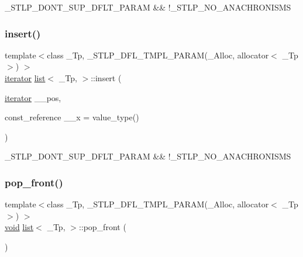 \+\_\+\+S\+T\+L\+P\+\_\+\+D\+O\+N\+T\+\_\+\+S\+U\+P\+\_\+\+D\+F\+L\+T\+\_\+\+P\+A\+R\+AM \&\& !\+\_\+\+S\+T\+L\+P\+\_\+\+N\+O\+\_\+\+A\+N\+A\+C\+H\+R\+O\+N\+I\+S\+MS \mbox{\label{classlist_aeb24294695fdc7463abc2f6e6528db39}} 
\subsubsection{\texorpdfstring{insert()}{insert()}\hspace{0.1cm}{\footnotesize\ttfamily [3/3]}}
{\footnotesize\ttfamily template$<$class \+\_\+\+Tp, \+\_\+\+S\+T\+L\+P\+\_\+\+D\+F\+L\+\_\+\+T\+M\+P\+L\+\_\+\+P\+A\+R\+A\+M(\+\_\+\+Alloc, allocator$<$ \+\_\+\+Tp $>$) $>$ \\
\hyperlink{structiterator}{iterator} \hyperlink{classlist}{list}$<$ \+\_\+\+Tp, $>$\+::insert (\begin{DoxyParamCaption}\item[{\hyperlink{structiterator}{iterator}}]{\+\_\+\+\_\+pos,  }\item[{const\+\_\+reference}]{\+\_\+\+\_\+x = {\ttfamily value\+\_\+type()} }\end{DoxyParamCaption})\hspace{0.3cm}{\ttfamily [inline]}}

\+\_\+\+S\+T\+L\+P\+\_\+\+D\+O\+N\+T\+\_\+\+S\+U\+P\+\_\+\+D\+F\+L\+T\+\_\+\+P\+A\+R\+AM \&\& !\+\_\+\+S\+T\+L\+P\+\_\+\+N\+O\+\_\+\+A\+N\+A\+C\+H\+R\+O\+N\+I\+S\+MS \mbox{\label{classlist_a069ca47c58b14e5da576c90240db1f34}} 
\subsubsection{\texorpdfstring{pop\+\_\+front()}{pop\_front()}}
{\footnotesize\ttfamily template$<$class \+\_\+\+Tp, \+\_\+\+S\+T\+L\+P\+\_\+\+D\+F\+L\+\_\+\+T\+M\+P\+L\+\_\+\+P\+A\+R\+A\+M(\+\_\+\+Alloc, allocator$<$ \+\_\+\+Tp $>$) $>$ \\
\hyperlink{interfacevoid}{void} \hyperlink{classlist}{list}$<$ \+\_\+\+Tp, $>$\+::pop\+\_\+front (\begin{DoxyParamCaption}{ }\end{DoxyParamCaption})\hspace{0.3cm}{\ttfamily [inline]}}


